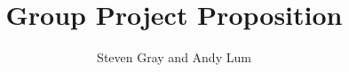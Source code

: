 \documentclass[10pt,conference,onecolumn,compsoc]{IEEtran}
\begin{document}
\title{Group Project Proposition}
\author{Steven Gray and Andy Lum}
\end{document}
